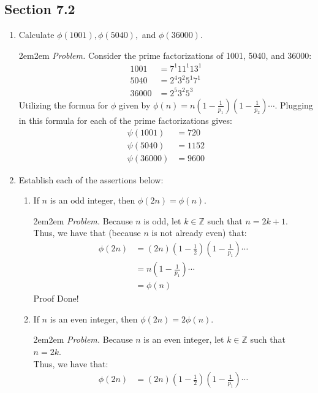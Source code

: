 \documentclass[10pt,oneside]{book}
\newcommand{\Z}{\mathbb{Z}}\newcommand{\R}{\mathbb{R}}\newcommand{\N}{\mathbb{N}}
\newcommand{\gspc}{\vspace{0.13cm}} %
\newcommand{\gline}{\gspc\\} %
\let\endoldproof\endproof
\newenvironment{problem}[1]
  {\vspace{-0.1cm}\begin{coloredadjust}\begin{adjustwidth}{2em}{2em}
   \textit{Problem. }#1}
  {\endoldproof
\end{adjustwidth}\end{coloredadjust}\gspc}
\begin{document}
\newcommand{\cg}[1]{\color{OliveGreen}#1\color{white}}
\newcommand{\cb}[1]{\color{BlueViolet}#1\color{white}}

\subsection*{Section 7.2}
\begin{enumerate}
	\item Calculate $\phi(1001), \phi(5040), $ and $\phi(36000)$.
	\begin{problem}
		Consider the prime factorizations of 1001, 5040, and 36000:
		\begin{align*}
			1001 &= 7^1 11^1 13^1 \\
			5040 &= 2^4 3^2 5^1 7^1 \\
			36000 &= 2^5 3^2 5^3 
		\end{align*}
		Utilizing the formua for $\phi$ given by $\phi(n) = n(1-\frac{1}{p_1})(1-\frac{1}{p_2})\cdots$. Plugging in this formula for each of the prime factorizations gives:
		\begin{align*}
			\psi(1001) &= 720\\
			\psi(5040) &= 1152\\
			\psi(36000) &= 9600
		\end{align*}
	\end{problem}
	\item [4.] Establish each of the assertions below:
	\begin{enumerate}
		\item If $n$ is an odd integer, then $\phi(2n) = \phi(n)$.
		\begin{problem}
			Because $n$ is odd, let $k\in \Z$ such that $n = 2k +1$. \gline
			Thus, we have that (because $n$ is not already even) that:
			\begin{align*}
				\phi(2n) &= (2n)(1-\frac{1}2)(1-\frac{1}{p_1})\cdots\\
				&= n(1- \frac{1}{p_1})\cdots\\
				&= \phi(n)
			\end{align*}
			Proof Done!
		\end{problem}
		\item If $n$ is an even integer, then $\phi(2n) = 2\phi(n)$. 
		\begin{problem}
			Because $n$ is an even integer, let $k\in\Z$ such that $n = 2k$. \gline
			Thus, we have that:
			\begin{align*}
				\phi(2n) &= (2n)(1-\frac{1}2)(1-\frac{1}{p_1})\cdots\\

\end{align*}
\end{problem}
\end{enumerate}
\end{enumerate}
\end{document}
